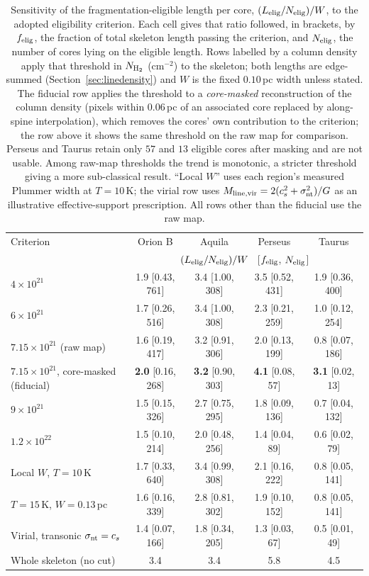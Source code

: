 \documentclass[usenatbib,twoside,twocolumn]{mnras}
\begin{document}
\begin{table}
\caption{Sensitivity of the fragmentation-eligible length per core, $(L_{\rm elig}/N_{\rm elig})/W$, to the adopted eligibility criterion. Each cell gives that ratio followed, in brackets, by $f_{\rm elig}$, the fraction of total skeleton length passing the criterion, and $N_{\rm elig}$, the number of cores lying on the eligible length. Rows labelled by a column density apply that threshold in $N_{\rm H_2}$ (cm$^{-2}$) to the skeleton; both lengths are edge-summed (Section~\ref{sec:linedensity}) and $W$ is the fixed $0.10$\,pc width unless stated. The fiducial row applies the threshold to a \emph{core-masked} reconstruction of the column density (pixels within $0.06$\,pc of an associated core replaced by along-spine interpolation), which removes the cores' own contribution to the criterion; the row above it shows the same threshold on the raw map for comparison. Perseus and Taurus retain only $57$ and $13$ eligible cores after masking and are not usable. Among raw-map thresholds the trend is monotonic, a stricter threshold giving a more sub-classical result. ``Local $W$'' uses each region's measured Plummer width at $T=10$\,K; the virial row uses $M_{\rm line,vir}=2(c_s^2+\sigma_{\rm nt}^2)/G$ as an illustrative effective-support prescription. All rows other than the fiducial use the raw map.}
\label{tab:eligible}
\footnotesize
\setlength{\tabcolsep}{3pt}
\begin{tabular}{lcccc}
\toprule
Criterion & Orion B & Aquila & Perseus & Taurus \\
 & \multicolumn{4}{c}{$(L_{\rm elig}/N_{\rm elig})/W$ \ [$f_{\rm elig}$, $N_{\rm elig}$]} \\
\midrule
$4\times10^{21}$      & 1.9 [0.43, 761] & 3.4 [1.00, 308] & 3.5 [0.52, 431] & 1.9 [0.36, 400] \\
$6\times10^{21}$      & 1.7 [0.26, 516] & 3.4 [1.00, 308] & 2.3 [0.21, 259] & 1.0 [0.12, 254] \\
$7.15\times10^{21}$ (raw map)  & 1.6 [0.19, 417] & 3.2 [0.91, 306] & 2.0 [0.13, 199] & 0.8 [0.07, 186] \\
$7.15\times10^{21}$, core-masked (fiducial) & \textbf{2.0} [0.16, 268] & \textbf{3.2} [0.90, 303] & \textbf{4.1} [0.08, 57] & \textbf{3.1} [0.02, 13] \\
$9\times10^{21}$      & 1.5 [0.15, 326] & 2.7 [0.75, 295] & 1.8 [0.09, 136] & 0.7 [0.04, 132] \\
$1.2\times10^{22}$    & 1.5 [0.10, 214] & 2.0 [0.48, 256] & 1.4 [0.04, 89] & 0.6 [0.02, 79] \\
\midrule
Local $W$, $T=10$\,K  & 1.7 [0.33, 640] & 3.4 [0.99, 308] & 2.1 [0.16, 222] & 0.8 [0.05, 141] \\
$T=15$\,K, $W=0.13$\,pc & 1.6 [0.16, 339] & 2.8 [0.81, 302] & 1.9 [0.10, 152] & 0.8 [0.05, 141] \\
\midrule
Virial, transonic $\sigma_{\rm nt}=c_s$ & 1.4 [0.07, 166] & 1.8 [0.34, 205] & 1.3 [0.03, 67] & 0.5 [0.01, 49] \\
\midrule
Whole skeleton (no cut) & 3.4 & 3.4 & 5.8 & 4.5 \\
\bottomrule
\end{tabular}
\end{table}
\end{document}
